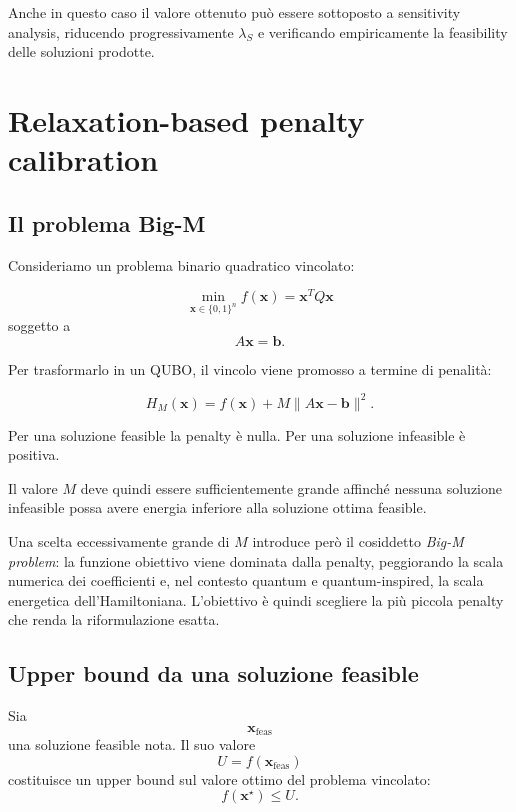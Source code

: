 \documentclass[11pt,a4paper]{report}
\begin{document}
Anche in questo caso il valore ottenuto può essere sottoposto a
sensitivity analysis, riducendo progressivamente $\lambda_S$ e
verificando empiricamente la feasibility delle soluzioni prodotte.

\chapter{Relaxation-based penalty calibration}

\section{Il problema Big-M}

Consideriamo un problema binario quadratico vincolato:

\[
\min_{\mathbf x\in\{0,1\}^n}
f(\mathbf x)
=
\mathbf x^TQ\mathbf x
\]
soggetto a
\[
A\mathbf x=\mathbf b.
\]

Per trasformarlo in un QUBO, il vincolo viene promosso a termine di
penalità:

\[
H_M(\mathbf x)
=
f(\mathbf x)
+
M\|A\mathbf x-\mathbf b\|^2.
\]

Per una soluzione feasible la penalty è nulla. Per una soluzione
infeasible è positiva. \newline

Il valore $M$ deve quindi essere sufficientemente grande affinché nessuna
soluzione infeasible possa avere energia inferiore alla soluzione ottima
feasible. \newline

Una scelta eccessivamente grande di $M$ introduce però il cosiddetto
\emph{Big-M problem}: la funzione obiettivo viene dominata dalla penalty,
peggiorando la scala numerica dei coefficienti e, nel contesto quantum e
quantum-inspired, la scala energetica dell'Hamiltoniana.
L'obiettivo è quindi scegliere la più piccola penalty che renda la
riformulazione esatta.

\section{Upper bound da una soluzione feasible}
Sia
\[
\mathbf x_{\mathrm{feas}}
\]
una soluzione feasible nota. Il suo valore
\[
U
=
f(\mathbf x_{\mathrm{feas}})
\]
costituisce un upper bound sul valore ottimo del problema vincolato:
\[
f(\mathbf x^\star)
\leq
U.
\]
\end{document}
